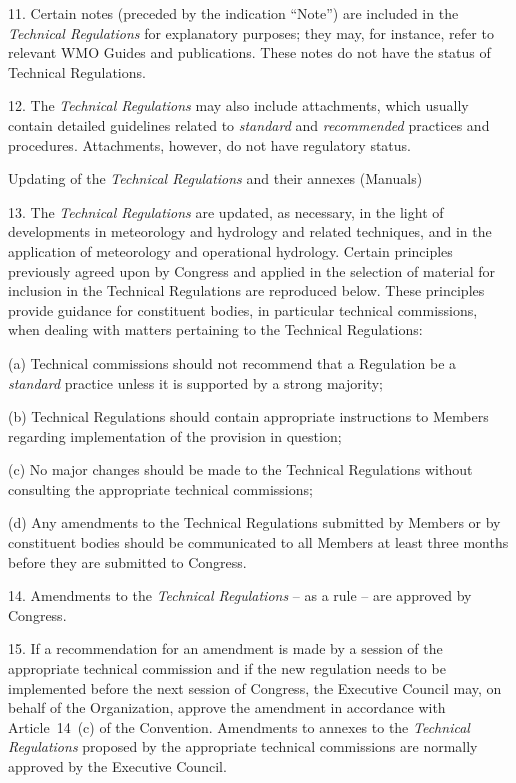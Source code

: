 11. Certain notes (preceded by the indication ``Note'') are included in the \emph{Technical Regulations} for explanatory purposes; they may, for instance, refer to relevant WMO Guides and publications. These notes do not have the status of Technical Regulations.

12. The \emph{Technical Regulations} may also include attachments, which usually contain detailed guidelines related to \emph{standard} and \emph{recommended} practices and procedures. Attachments, however, do not have regulatory status.

Updating of the \emph{Technical Regulations} and their annexes (Manuals)

13. The \emph{Technical Regulations} are updated, as necessary, in the light of developments in meteorology and hydrology and related techniques, and in the application of meteorology and operational hydrology. Certain principles previously agreed upon by Congress and applied in the selection of material for inclusion in the Technical Regulations are reproduced below. These principles provide guidance for constituent bodies, in particular technical commissions, when dealing with matters pertaining to the Technical Regulations:

(a) Technical commissions should not recommend that a Regulation be a \emph{standard} practice unless it is supported by a strong majority;

(b) Technical Regulations should contain appropriate instructions to Members regarding implementation of the provision in question;

(c) No major changes should be made to the Technical Regulations without consulting the appropriate technical commissions;

(d) Any amendments to the Technical Regulations submitted by Members or by constituent bodies should be communicated to all Members at least three months before they are submitted to Congress.

14. Amendments to the \emph{Technical Regulations} -- as a rule -- are approved by Congress.

15. If a recommendation for an amendment is made by a session of the appropriate technical commission and if the new regulation needs to be implemented before the next session of Congress, the Executive Council may, on behalf of the Organization, approve the amendment in accordance with Article~14~(c) of the Convention. Amendments to annexes to the \emph{Technical Regulations} proposed by the appropriate technical commissions are normally approved by the Executive Council.

